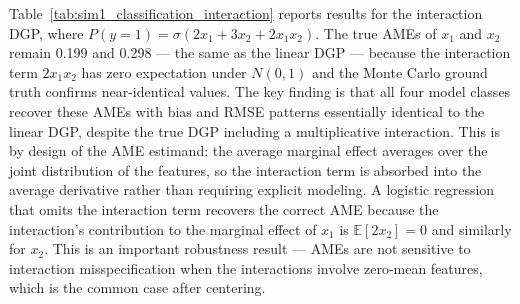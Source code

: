 \documentclass[12pt]{article}
\begin{document}
	Table~\ref{tab:sim1_classification_interaction} reports results for the interaction DGP, where $P(y=1) = \sigma(2x_1 + 3x_2 + 2x_1 x_2)$. The true AMEs of $x_1$ and $x_2$ remain 0.199 and 0.298 --- the same as the linear DGP --- because the interaction term $2x_1 x_2$ has zero expectation under $N(0,1)$ and the Monte Carlo ground truth confirms near-identical values. The key finding is that all four model classes recover these AMEs with bias and RMSE patterns essentially identical to the linear DGP, despite the true DGP including a multiplicative interaction. This is by design of the AME estimand: the average marginal effect averages over the joint distribution of the features, so the interaction term is absorbed into the average derivative rather than requiring explicit modeling. A logistic regression that omits the interaction term recovers the correct AME because the interaction's contribution to the marginal effect of $x_1$ is $\mathbb{E}[2x_2] = 0$ and similarly for $x_2$. This is an important robustness result --- AMEs are not sensitive to interaction misspecification when the interactions involve zero-mean features, which is the common case after centering.
	
\end{document}
